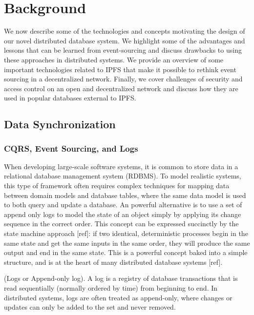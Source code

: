 \documentclass{comjnl}
\begin{document}
\section{Background}
\label{sec:Background}

We now describe some of the technologies and concepts motivating the design of our novel distributed database system. We highlight some of the advantages and lessons that can be learned from event-sourcing and discuss drawbacks to using these approaches in distributed systems. We provide an overview of some important technologies related to IPFS that make it possible to rethink event sourcing in a decentralized network. Finally, we cover challenges of security and access control on an open and decentralized network and discuss how they are used in popular databases external to IPFS. 

\subsection{Data Synchronization}

\subsubsection{CQRS, Event Sourcing, and Logs}

When developing large-scale software systems, it is common to store data in a relational database management system (RDBMS). To model realistic systems, this type of framework often requires complex techniques for mapping data between domain models and database tables, where the same data model is used to both query and update a database. An powerful alternative is to use a set of append only logs to model the state of an object simply by applying its change sequence in the correct order. This concept can be expressed succinctly by the state machine approach [ref]: if two identical, deterministic processes begin in the same state and get the same inputs in the same order, they will produce the same output and end in the same state. This is a powerful concept baked into a simple structure, and is at the heart of many distributed database systems [ref].

\begin{definition} (Logs or Append-only log). A log is a registry of database transactions that is read sequentially (normally ordered by time) from beginning to end. In distributed systems, logs are often treated as append-only, where changes or updates can only be added to the set and never removed.  \end{definition}
\end{document}
